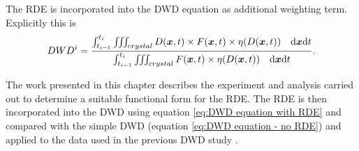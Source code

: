 The RDE is incorporated into the DWD equation as additional weighting term.
Explicitly this is
\begin{equation}
    DWD^i = \frac{\int_{t_{i-1}}^{t_{i}} \iiint_{crystal} D(\boldsymbol{x},t) \times F(\boldsymbol{x},t) \times \eta(D(\boldsymbol{x},t)) \quad \mathrm{d}\boldsymbol{x}\mathrm{d} t}{\int_{t_{i-1}}^{t_{i}} \iiint_{crystal}F(\boldsymbol{x},t) \times \eta(D(\boldsymbol{x},t)) \quad \mathrm{d}\boldsymbol{x}\mathrm{d} t}.
    \label{eq:DWD equation with RDE}
\end{equation}

The work presented in this chapter describes the experiment and analysis carried out to determine a suitable functional form for the RDE.
The RDE is then incorporated into the DWD using equation \ref{eq:DWD equation with RDE} and compared with the simple DWD (equation \ref{eq:DWD equation - no RDE}) and applied to the data used in the previous DWD study \cite{zeldin2013dwd}.
